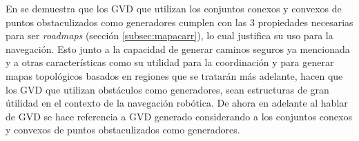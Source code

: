 
En \cite{choset2005principles} se demuestra que los GVD que utilizan los
conjuntos conexos y convexos de puntos obstaculizados como generadores cumplen
con las 3 propiedades necesarias para ser \emph{roadmaps} (sección
\ref{subsec:mapacarr}), lo cual justifica su uso para la navegación. Esto junto
a la capacidad de generar caminos seguros ya mencionada y a otras
características como su utilidad para la coordinación y para generar mapas
topológicos basados en regiones que se tratarán más adelante, hacen que los GVD
que utilizan obstáculos como generadores, sean estructuras de gran útilidad en
el contexto de la navegación robótica. De ahora en adelante al hablar de GVD se
hace referencia a GVD generado considerando a los conjuntos conexos y convexos
de puntos obstaculizados como generadores.


